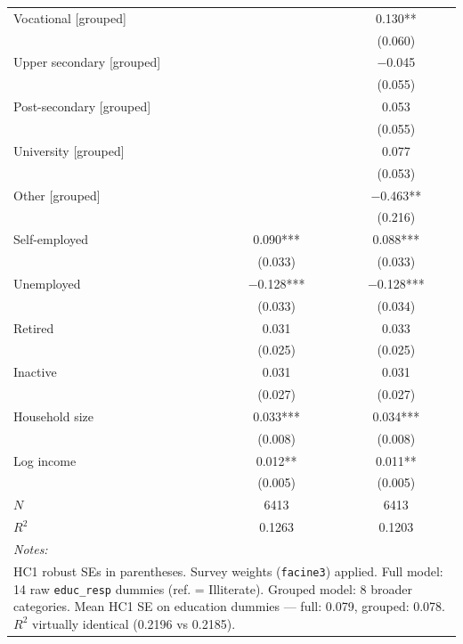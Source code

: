 \begin{table}
\begin{tabular}[t]{lcc}
\hspace{6pt} Vocational [grouped] &  & \num{0.130}**\\
 &  & (\num{0.060})\\
\hspace{6pt} Upper secondary [grouped] &  & \num{-0.045}\\
 &  & \vphantom{1} (\num{0.055})\\
\hspace{6pt} Post-secondary [grouped] &  & \num{0.053}\\
 &  & (\num{0.055})\\
\hspace{6pt} University [grouped] &  & \num{0.077}\\
 &  & (\num{0.053})\\
\hspace{6pt} Other [grouped] &  & \num{-0.463}**\\
 &  & (\num{0.216})\\
\hspace{6pt} Self-employed & \num{0.090}*** & \num{0.088}***\\
 & (\num{0.033}) & (\num{0.033})\\
\hspace{6pt} Unemployed & \num{-0.128}*** & \num{-0.128}***\\
 & (\num{0.033}) & (\num{0.034})\\
\hspace{6pt} Retired & \num{0.031} & \num{0.033}\\
 & (\num{0.025}) & (\num{0.025})\\
\hspace{6pt} Inactive & \num{0.031} & \num{0.031}\\
 & (\num{0.027}) & (\num{0.027})\\
Household size & \num{0.033}*** & \num{0.034}***\\
 & (\num{0.008}) & (\num{0.008})\\
Log income & \num{0.012}** & \num{0.011}**\\
 & (\num{0.005}) & (\num{0.005})\\
\midrule
$N$ & \num{6413} & \num{6413}\\
$R^2$ & \num{0.1263} & \num{0.1203}\\
\bottomrule
\multicolumn{3}{l}{\rule{0pt}{1em}\textit{\textit{Notes:} }}\\
\multicolumn{3}{l}{\rule{0pt}{1em}HC1 robust SEs in parentheses. Survey weights (\texttt{facine3}) applied. Full model: 14 raw \texttt{educ_resp} dummies (ref. = Illiterate). Grouped model: 8 broader categories. Mean HC1 SE on education dummies --- full: 0.079, grouped: 0.078. $R^2$ virtually identical (0.2196 vs 0.2185).}\\

\end{tabular}
\end{table}
